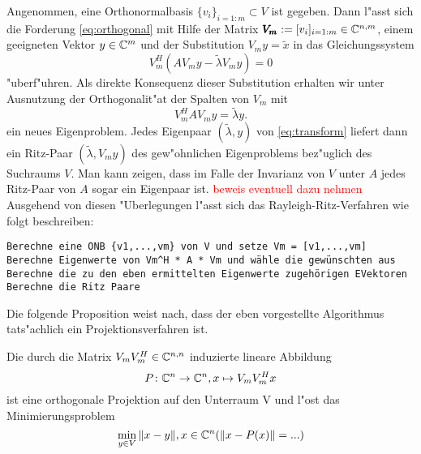 Angenommen, eine Orthonormalbasis $\{v_i\}_{i=1:m}\subset V$ ist gegeben.
Dann l"asst sich die Forderung \eqref{eq:orthogonal} mit Hilfe der Matrix $\pmb{V_m} :=[v_i]_{i=1:m}\in\mathbb{C}^{n,m}$, einem geeigneten Vektor
$y\in\mathbb{C}^m$ und der Substitution $V_m y=\widetilde{x}$ in das Gleichungssystem
\[
V_m^H(AV_m y - \widetilde{\lambda} V_m y) = 0
\]
"uberf"uhren. Als direkte Konsequenz dieser Substitution erhalten wir unter Ausnutzung der Orthogonalit"at der Spalten von $V_m$ mit
\begin{equation}\label{eq:transform}
V_m^H A V_m y = \widetilde{\lambda}y.
\end{equation}
ein neues Eigenproblem. Jedes Eigenpaar $(\widetilde{\lambda},y)$ von \eqref{eq:transform}
liefert dann ein Ritz-Paar $(\widetilde{\lambda}, V_m y)$ des gew"ohnlichen
Eigenproblems bez"uglich des Suchraums $V$. Man kann zeigen, dass im Falle der Invarianz
von $V$ unter $A$ jedes Ritz-Paar von $A$ sogar ein Eigenpaar ist. \textcolor{red}{beweis eventuell dazu nehmen}\\

Ausgehend von diesen "Uberlegungen l"asst sich das Rayleigh-Ritz-Verfahren wie folgt
beschreiben:

\begin{lstlisting}[caption = Rayleigh-Ritz-Verfahren (Vgl. Saad Algo. 4.5), captionpos=b]
Berechne eine ONB {v1,...,vm} von V und setze Vm = [v1,...,vm]
Berechne Eigenwerte von Vm^H * A * Vm und wähle die gewünschten aus
Berechne die zu den eben ermittelten Eigenwerte zugehörigen EVektoren
Berechne die Ritz Paare
\end{lstlisting}

Die folgende Proposition weist nach, dass der eben vorgestellte Algorithmus tats"achlich
ein Projektionsverfahren ist.

\begin{prop}\label{prop:projektor}
Die durch die Matrix $V_m V_m^H \in \mathbb{C}^{n,n}$ induzierte lineare Abbildung
\[
P\colon \mathbb{C}^n \to \mathbb{C}^n, x\mapsto V_m V_m^H x
\]
ist eine orthogonale Projektion auf den Unterraum V und l"ost das Minimierungsproblem
\[
\min_{y\in V}\|x-y\|, x\in\mathbb{C}^n (\|x-P(x)\| = ...)
\]
\end{prop}

